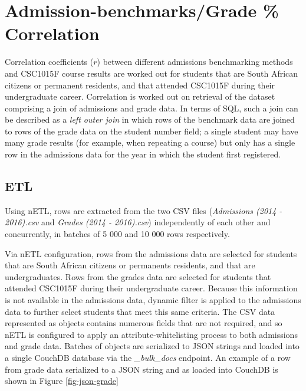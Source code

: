 \section{Admission-benchmarks/Grade \% Correlation}
Correlation coefficients ($r$) between different admissions benchmarking methods and CSC1015F course results are worked out for students that are South African citizens or permanent residents, and that attended CSC1015F during their undergraduate career. Correlation is worked out on retrieval of the dataset comprising a join of admissions and grade data. In terms of SQL, such a join can be described as a \textit{left outer join} in which rows of the benchmark data are joined to rows of the grade data on the student number field; a single student may have many grade results (for example, when repeating a course) but only has a single row in the admissions data for the year in which the student first registered.

\subsection{ETL}
Using nETL, rows are extracted from the two CSV files (\textit{Admissions (2014 - 2016).csv} and \textit{Grades (2014 - 2016).csv}) independently of each other and concurrently, in batches of 5 000 and 10 000 rows respectively.

Via nETL configuration, rows from the admissions data are selected for students that are South African citizens or permanents residents, and that are undergraduates. Rows from the grades data are selected for students that attended CSC1015F during their undergraduate career. Because this information is not available in the admissions data, dynamic filter is applied to the admissions data to further select students that meet this same criteria. The CSV data represented as objects contains numerous fields that are not required, and so nETL is configured to apply an attribute-whitelisting process to both admissions and grade data. Batches of objects are serialized to JSON strings and loaded into a single CouchDB database via the \textit{\_bulk\_docs} endpoint. An example of a row from grade data serialized to a JSON string and as loaded into CouchDB is shown in Figure \ref{fig-json-grade}



